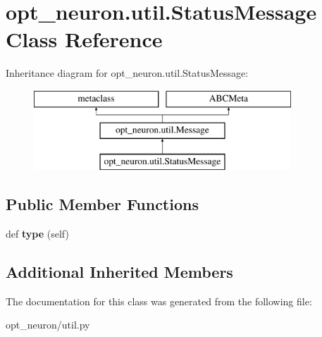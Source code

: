 \hypertarget{classopt__neuron_1_1util_1_1StatusMessage}{}\section{opt\+\_\+neuron.\+util.\+Status\+Message Class Reference}
\label{classopt__neuron_1_1util_1_1StatusMessage}
Inheritance diagram for opt\+\_\+neuron.\+util.\+Status\+Message\+:\begin{figure}[H]
\begin{center}
\leavevmode
\includegraphics[height=3.000000cm]{classopt__neuron_1_1util_1_1StatusMessage}
\end{center}
\end{figure}
\subsection*{Public Member Functions}
\begin{DoxyCompactItemize}
\item 
\hypertarget{classopt__neuron_1_1util_1_1StatusMessage_abd4de006fbca5082fba18c7f5a4108b6}{}def {\bfseries type} (self)\label{classopt__neuron_1_1util_1_1StatusMessage_abd4de006fbca5082fba18c7f5a4108b6}

\end{DoxyCompactItemize}
\subsection*{Additional Inherited Members}


The documentation for this class was generated from the following file\+:\begin{DoxyCompactItemize}
\item 
opt\+\_\+neuron/util.\+py\end{DoxyCompactItemize}
